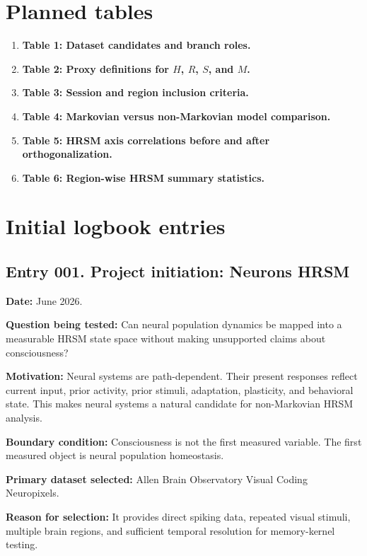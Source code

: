 \documentclass[11pt]{article}
\begin{document}
\section{Planned tables}

\begin{enumerate}
    \item \textbf{Table 1: Dataset candidates and branch roles.}
    \item \textbf{Table 2: Proxy definitions for $H$, $R$, $S$, and $M$.}
    \item \textbf{Table 3: Session and region inclusion criteria.}
    \item \textbf{Table 4: Markovian versus non-Markovian model comparison.}
    \item \textbf{Table 5: HRSM axis correlations before and after orthogonalization.}
    \item \textbf{Table 6: Region-wise HRSM summary statistics.}
\end{enumerate}

\section{Initial logbook entries}

\subsection*{Entry 001. Project initiation: Neurons HRSM}

\textbf{Date:} June 2026.

\textbf{Question being tested:} Can neural population dynamics be mapped into a measurable HRSM state space without making unsupported claims about consciousness?

\textbf{Motivation:} Neural systems are path-dependent. Their present responses reflect current input, prior activity, prior stimuli, adaptation, plasticity, and behavioral state. This makes neural systems a natural candidate for non-Markovian HRSM analysis.

\textbf{Boundary condition:} Consciousness is not the first measured variable. The first measured object is neural population homeostasis.

\textbf{Primary dataset selected:} Allen Brain Observatory Visual Coding Neuropixels.

\textbf{Reason for selection:} It provides direct spiking data, repeated visual stimuli, multiple brain regions, and sufficient temporal resolution for memory-kernel testing.
\end{document}
